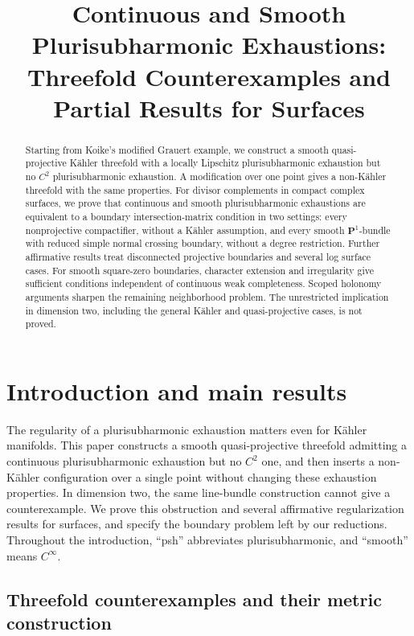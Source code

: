 \documentclass[11pt]{amsart}
\title[Continuous and smooth plurisubharmonic exhaustions]{Continuous and Smooth
Plurisubharmonic Exhaustions:\\
Threefold Counterexamples and Partial Results for Surfaces}
\author{}
\date{}
\theoremstyle{definition}
\theoremstyle{remark}
\numberwithin{equation}{section}
\newcommand{\PP}{\mathbf P}
\begin{document}
\begin{abstract}
Starting from Koike's modified Grauert example, we construct a smooth
quasi-projective K\"ahler threefold with a locally Lipschitz
plurisubharmonic exhaustion but no $C^2$ plurisubharmonic exhaustion. A modification over one point gives a non-K\"ahler threefold
with the same properties. For divisor complements in compact complex
surfaces, we prove that continuous and smooth plurisubharmonic
exhaustions are equivalent to a boundary intersection-matrix condition
in two settings: every nonprojective compactifier, without a K\"ahler
assumption, and every smooth $\PP^1$-bundle with reduced simple normal
crossing boundary, without a degree restriction. Further affirmative
results treat disconnected projective boundaries and several log
surface cases. For smooth square-zero boundaries, character extension
and irregularity give sufficient conditions independent of continuous
weak completeness. Scoped holonomy arguments sharpen the remaining
neighborhood problem. The unrestricted implication in dimension two,
including the general K\"ahler and quasi-projective cases, is not proved.
\end{abstract}

\maketitle

\section{Introduction and main results}\label{sec:intro}

The regularity of a plurisubharmonic exhaustion matters even for
K\"ahler manifolds. This paper constructs a smooth quasi-projective
threefold admitting a continuous plurisubharmonic exhaustion but no
$C^2$ one, and then inserts a non-K\"ahler configuration over a single
point without changing these exhaustion properties. In dimension two,
the same line-bundle construction cannot give a counterexample. We
prove this obstruction and several affirmative regularization results
for surfaces, and specify the boundary problem left by our reductions.
Throughout the introduction, ``psh'' abbreviates plurisubharmonic, and
``smooth'' means $C^\infty$.

\subsection{Threefold counterexamples and their metric construction}
\end{document}
